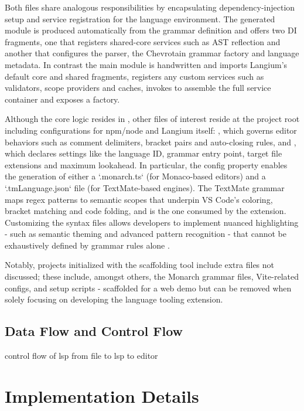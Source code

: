 Both  files share analogous responsibilities by encapsulating dependency-injection setup and service registration for the language environment.
The generated module is produced automatically from the grammar definition and offers two DI fragments, one that registers shared-core services such as AST
reflection and another that configures the parser, the Chevrotain grammar factory and language metadata. In contrast the main module is handwritten and imports
Langium's default core and shared fragments, registers any custom services such as validators, scope providers and caches, invokes  to assemble the full
service container and exposes a  factory.

Although the core logic resides in , other files of interest reside at the project root including configurations for npm/node and Langium itself:
, which governs editor behaviors such as comment delimiters, bracket pairs and auto-closing rules, and
, which declares settings like the language ID, grammar entry point, target file extensions and maximum lookahead.
In particular, the  config property enables the generation of either a `.monarch.ts` (for Monaco-based editors) and a `.tmLanguage.json` file (for TextMate-based engines).
The TextMate grammar maps regex patterns to semantic scopes that underpin VS Code's coloring, bracket
matching and code folding, and is the one consumed by the extension. Customizing the syntax files allows developers to implement nuanced highlighting
- such as semantic theming and advanced pattern recognition - that cannot be exhaustively defined by grammar rules alone \cite{EDKarlsson2022Discussion604}.

Notably, projects initialized with the scaffolding tool include extra files not discussed; these include, amongst others, the Monarch grammar files, Vite-related configs,
and setup scripts - scaffolded for a web demo but can be removed when solely focusing on developing the language tooling extension.

\section{Data Flow and Control Flow}
control flow of lsp from file to lsp to editor

\chapter{Implementation Details}
\label{sec:langium-grammar}
